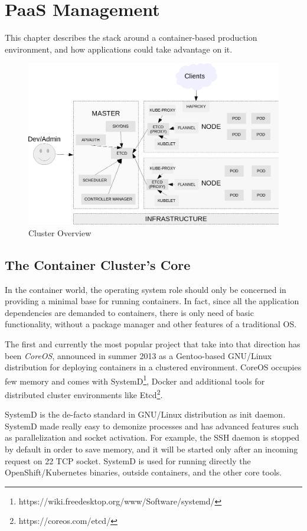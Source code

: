 \chapter{PaaS Management}\label{paas-management}

This chapter describes the stack around a container-based production
environment, and how applications could take advantage on it.

\begin{figure}[htbp]
\centering
\includegraphics{media/ch5-overview.png}
\caption{Cluster Overview}
\end{figure}

\section{The Container Cluster's Core}\label{the-container-clusters-core}

In the container world, the operating system role should only be concerned in providing a minimal base for running containers.  In fact, since all the application dependencies are demanded to containers, there is only need of basic functionality, without a package manager and other features of a traditional OS.

The first and currently the most popular project that take into that direction has been \textit{CoreOS}, announced in summer 2013 as a Gentoo-based GNU/Linux distribution for deploying containers in a clustered environment. CoreOS occupies few memory and comes with SystemD\footnote{https://wiki.freedesktop.org/www/Software/systemd/}, Docker and additional tools for distributed cluster environments like Etcd\footnote{https://coreos.com/etcd/}.

SystemD is the de-facto standard in GNU/Linux distribution as init daemon. SystemD made really easy to demonize processes and has advanced features such as parallelization and socket activation.  For example, the SSH daemon is stopped by default in order to save memory, and it will be started only after an incoming request on 22 TCP socket.  SystemD is used for running directly the OpenShift/Kubernetes binaries, outside containers, and the other core tools.


